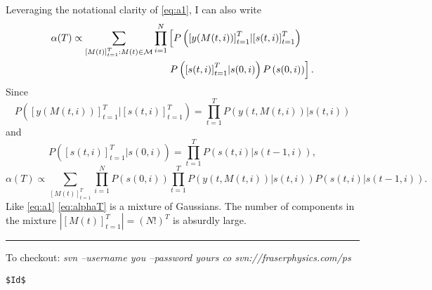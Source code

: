 \documentclass[12pt]{article}
\newcommand{\M}{{\cal M}}
\newcommand{\os}[4]{{\left[ #1(#2) \right]}_{#3}^{#4}} %
\newcommand{\ti}[2]{{#1}{(#2)}}                         %
\newcommand{\ts}[4]{\os{#1}{#2}{#2=#3}{#4}} %
\begin{document}
Leveraging the notational clarity of \eqref{eq:a1}, I can also write
\begin{align*}
  \ti{\alpha}{T} \propto \sum_{\os{M}{t}{t=1}{T}:\ti{M}{t}\in \M}
  \prod_{i=1}^N& \left[
  P\left( \os{y}{\ti{M}{t,i}}{t=1}{T} | \os{s}{t,i}{t=1}{T}\right) \right. \\
  & \left. P\left( \os{s}{t,i}{t=1}{T}| \ti{s}{0,i} \right)
  P\left( \ti{s}{0,i} \right) \right] .
\end{align*}
Since
\begin{equation*}
  P\left( \os{y}{\ti{M}{t,i}}{t=1}{T} | \os{s}{t,i}{t=1}{T}\right) =
  \prod_{t=1}^T P\left( \ti{y}{t,\ti{M}{t,i}} | \ti{s}{t,i}\right)
\end{equation*}
and
\begin{equation*}
  P\left( \os{s}{t,i}{t=1}{T}| \ti{s}{0,i} \right) = \prod_{t=1}^T
  P\left( \ti{s}{t,i} | \ti{s}{t-1,i}\right),
\end{equation*}
\begin{equation}
  \label{eq:alphaT}
  \ti{\alpha}{T} \propto \sum_{\os{M}{t}{t=1}{T}}
  \prod_{i=1}^N  P\left( \ti{s}{0,i} \right) \prod_{t=1}^T
  P\left( \ti{y}{t,\ti{M}{t,i}} | \ti{s}{t,i}\right)
  P\left( \ti{s}{t,i} | \ti{s}{t-1,i}\right).
\end{equation}
Like \eqref{eq:a1} \eqref{eq:alphaT} is a mixture of Gaussians.  The
number of components in the mixture $\left| \ts{M}{t}{1}{T}\right| =
(N!)^T$ is absurdly large.

\vfill \hrule To checkout: \emph{ svn --username you --password yours
  co svn://fraserphysics.com/ps}
\begin{verbatim}
$Id$
\end{verbatim}
\end{document}
